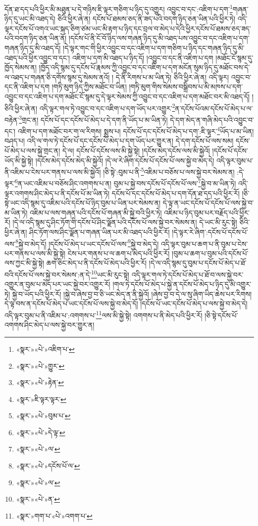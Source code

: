 དོན་ཐ་དད་པའི་ཕྱིར་མི་མཐུན་པ་དེ་གཉིས་ཇི་ལྟར་གཅིག་པ་ཉིད་དུ་འགྱུར། འབྱུང་བ་དང་:འཇིག་པ་དག་\footnote{«སྣར་»«པེ་»འཇིག་པ་}གཞན་ཉིད་དུ་ཡང་མི་འཐད་དེ། ཅིའི་ཕྱིར་ཞེ་ན། དངོས་པོ་ཐམས་ཅད་ནི་ཟད་པའི་བདག་ཉིད་ཅན་ཡིན་པའི་ཕྱིར་ཏེ། འདི་ལྟར་དངོས་པོ་འགའ་ཡང་སྐད་ཅིག་ཙམ་ཡང་མི་རྟག་པ་ཉིད་དང་བྲལ་བ་མེད་པ་དེའི་ཕྱིར་དངོས་པོ་ཐམས་ཅད་ཟད་པའི་བདག་ཉིད་ཅན་ཡིན་ནོ། །དངོས་པོ་ནི་ངོ་བོ་ཉིད་ལས་གཞན་ཉིད་དུ་མི་འཐད་པས་འབྱུང་བ་དང་འཇིག་པ་དག་གཞན་ཉིད་དུ་མི་འཐད་དོ། །དེ་ལྟར་གང་གི་ཕྱིར་འབྱུང་བ་དང་འཇིག་པ་དག་གཅིག་པ་ཉིད་དང་གཞན་ཉིད་དུ་མི་འཐད་པའི་ཕྱིར་འབྱུང་བ་དང་། འཇིག་པ་དག་མི་འཐད་པ་ཉིད་དོ། །འབྱུང་བ་དང་ནི་འཇིག་པ་དག །མཐོང་ངོ་སྙམ་དུ་ཁྱོད་སེམས་ན། །ཁྱོད་འདི་སྙམ་དུ་དངོས་པོ་རྣམས་ཀྱི་འབྱུང་བ་དང་འཇིག་པ་དག་མངོན་སུམ་ཉིད་དུ་མཐོང་བས་དེ་ལ་འཐད་པ་གཞན་ཅི་དགོས་སྙམ་དུ་སེམས་ནའོ། །
དེ་ནི་རིགས་པ་མ་ཡིན་ཏེ། ཅིའི་ཕྱིར་ཞེ་ན། འདི་ལྟར། འབྱུང་བ་དང་ནི་འཇིག་པ་དག །གཏི་མུག་ཉིད་ཀྱིས་མཐོང་བ་ཡིན། །གཏི་མུག་གིས་སེམས་བསྒྲིབས་པ་མི་མཁས་པ་དག་འབྱུང་བ་དང་འཇིག་པ་དག་མཐོང་ངོ་སྙམ་དུ་དེ་ལྟར་སེམས་ཀྱི་འབྱུང་བ་དང་འཇིག་པ་དག་མཐོང་བར་མི་འཐད་དོ། །ཅིའི་ཕྱིར་ཞེ་ན། འདི་ལྟར་གལ་ཏེ་འབྱུང་བ་དང་འཇིག་པ་དག་ཡོད་པར་འགྱུར་\footnote{«སྣར་»«པེ་»གྱུར་}ན་དངོས་པོའམ་དངོས་པོ་མེད་པ་ལ་བརྟེན་\footnote{«སྣར་»«པེ་»རྟེན་}གྲང་ན། དངོས་པོ་དང་དངོས་པོ་མེད་པ་དེ་དག་ནི་ཡོད་པ་མ་ཡིན་ཏེ། དེ་དག་མེད་ན་གཞི་མེད་པའི་འབྱུང་བ་དང་། འཇིག་པ་དག་མཐོང་བར་ག་ལ་རིགས། སྨྲས་པ། དངོས་པོ་དང་དངོས་པོ་མེད་པ་དག་:ཇི་ལྟར་\footnote{«སྣར་»ཇི་ལྟར་ལྟར་}ཡོད་པ་མ་ཡིན། བཤད་པ། འདི་ལ་གལ་ཏེ་དངོས་པོ་དང་དངོས་པོ་མེད་པ་དག་ཡོད་པར་གྱུར་ན། དེ་དག་དངོས་པོ་ལས་སམ། དངོས་པོ་མེད་པ་ལས་སྐྱེ་གྲང་ན། དེ་ལ། དངོས་པོ་དངོས་ལས་མི་སྐྱེ་སྟེ། །དངོས་མེད་དངོས་ལས་མི་སྐྱེའོ། །དངོས་པོ་དངོས་ཡོད་མི་སྐྱེ་སྟེ། །དངོས་མེད་དངོས་མེད་མི་སྐྱེའོ། །དེ་ལ་རེ་ཞིག་དངོས་པོ་དངོས་པོ་ལས་སྐྱེ་བ་མེད་དེ། འདི་ལྟར་བུམ་པ་ནི་འཇིམ་པ་ངེས་པར་གནས་པ་ལས་མི་སྐྱེའོ། །ཅི་སྟེ་:བུམ་པ་ནི་\footnote{«སྣར་»«པེ་»བུམ་པ་}འཇིམ་པ་བཅོས་པ་ལས་སྐྱེ་བར་སེམས་ན། :དེ་ལྟར་\footnote{«སྣར་»«པེ་»དེ་ལྟ་}ན་ཡང་འཇིམ་པ་བཅོས་ཤིང་འགགས་པ་ན། བུམ་པ་སྐྱེ་བས་དངོས་པོ་དངོས་པོ་ལས་\footnote{«སྣར་»«པེ་»ལ་}སྐྱེ་བ་མ་ཡིན་ཏེ། འདི་ལྟར་འགགས་ཤིང་མེད་པ་ནི་དངོས་པོ་མ་ཡིན་ཏེ། དངོས་པོ་དང་དངོས་པོ་མེད་པ་དག་དོན་ཐ་དད་པའི་ཕྱིར་རོ། །ཅི་སྟེ་ཡང་འདི་སྙམ་དུ་འཇིམ་པའི་དངོས་པོ་ཉིད་བུམ་པ་ཡིན་པར་སེམས་ན། དེ་ལྟ་ན་ཡང་དངོས་པོ་དངོས་པོ་ལས་སྐྱེ་བ་མ་ཡིན་ཏེ། འཇིམ་པ་ལས་གཞན་པའི་དངོས་པོ་གཞན་མི་སྐྱེ་བའི་ཕྱིར་ཏེ། འཇིམ་པ་ཉིད་བུམ་པར་བརྗོད་པའི་ཕྱིར་རོ། །དེ་ལ་འདི་སྙམ་དུ་ཤིང་ཏོག་གི་དངོས་པོ་ཤིང་ལྗོན་པའི་དངོས་པོ་ལས་སྐྱེ་བར་སེམས་ན། དེ་ཡང་མི་རུང་སྟེ། ཅིའི་ཕྱིར་ཞེ་ན། ཤིང་ཏོག་ལས་ཤིང་ལྗོན་པ་གཞན་ཡིན་པར་མི་འཐད་པའི་ཕྱིར་རོ། །དེ་ལྟར་རེ་ཞིག་:དངོས་པོ་དངོས་པོ་ལས་\footnote{«སྣར་»«པེ་»དངོས་པོ་ལ་}སྐྱེ་བ་མེད་དོ། །དངོས་པོ་མེད་པ་ཡང་དངོས་པོ་ལས་\footnote{«སྣར་»«པེ་»ལ་}སྐྱེ་བ་མེད་དེ། འདི་ལྟར་བུམ་པ་ཆག་པ་ནི་བུམ་པ་ངེས་པར་གནས་པ་ལས་མི་སྐྱེ་སྟེ། ངེས་པར་གནས་པ་ལ་ཆག་པ་མེད་པའི་ཕྱིར་རོ། །བུམ་པ་ཆག་པ་བུམ་པའི་དངོས་པོ་ལས་ཀྱང་མི་སྐྱེ་སྟེ། ཆག་ཅིང་མེད་པ་ནི་དངོས་པོ་མེད་པའི་ཕྱིར་རོ། །དེ་ལ་འདི་སྙམ་དུ་བུམ་པ་དངོས་པོ་མེད་པ་ཐོ་བའི་དངོས་པོ་ལས་སྐྱེ་བར་སེམས་:ན་དེ་\footnote{«སྣར་»«པེ་»ན་}ཡང་མི་རུང་སྟེ། འདི་ལྟར་གལ་ཏེ་དངོས་པོ་མེད་པ་ཐོ་བ་ལས་སྐྱེ་བར་འགྱུར་ན་བུམ་པ་མེད་པར་ཡང་སྐྱེ་བར་འགྱུར་རོ། །གལ་ཏེ་དངོས་པོ་མེད་པ་སྐྱེ་ན་དངོས་པོ་མེད་པ་ཉིད་དུ་མི་འགྱུར་ཏེ། སྐྱེ་བ་ཡོད་པའི་ཕྱིར་རོ། །སྐྱེ་བ་ཞེས་བྱ་བ་ཅི་ཡང་མེད་ན་ནི་སྐྱེའོ། །ཞེས་བྱ་བ་དེ་ལ་སུ་ཞིག་ཡིད་ཆེས་པར་རིགས། དེ་ལྟ་བས་ན་དངོས་པོ་མེད་པ་ཡང་དངོས་པོ་ལས་སྐྱེ་བ་མེད་དོ། །དངོས་པོ་ཡང་དངོས་པོ་མེད་པ་ལས་སྐྱེ་བ་མེད་དེ། འདི་ལྟར་བུམ་པ་ནི་འཇིམ་པ་:འགགས་པ་\footnote{«སྣར་»གག་པ་«པེ་»འགག་པ་}ལས་མི་སྐྱེ་སྟེ། འགགས་པ་ནི་མེད་པའི་ཕྱིར་རོ། །ཅི་སྟེ་དངོས་པོ་འགགས་ཤིང་མེད་པ་ལས་སྐྱེ་བར་གྱུར་ན། 